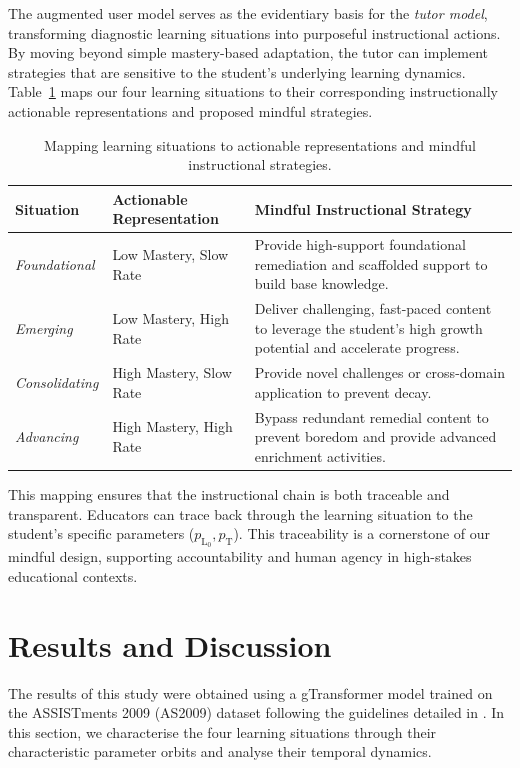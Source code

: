 \documentclass[runningheads]{llncs}
\begin{document}
The augmented user model serves as the evidentiary basis for the \textit{tutor model}, transforming diagnostic learning situations into purposeful instructional actions. By moving beyond simple mastery-based adaptation, the tutor can implement strategies that are sensitive to the student's underlying learning dynamics. Table~\ref{tab_strategies} maps our four learning situations to their corresponding instructionally actionable representations and proposed mindful strategies.

\begin{table}[htb]
\caption{Mapping learning situations to actionable representations and mindful instructional strategies.}
\label{tab_strategies}
\centering
\footnotesize
\begin{tabularx}{\textwidth}{l X X}
\toprule
\textbf{Situation} & \textbf{Actionable Representation} & \textbf{Mindful Instructional Strategy} \\
\midrule
\textit{Foundational} & Low Mastery, Slow Rate & Provide high-support foundational remediation and scaffolded support to build base knowledge. \\
\textit{Emerging} & Low Mastery, High Rate & Deliver challenging, fast-paced content to leverage the student's high growth potential and accelerate progress. \\
\textit{Consolidating} & High Mastery, Slow Rate & Provide novel challenges or cross-domain application to prevent decay. \\
\textit{Advancing} & High Mastery, High Rate & Bypass redundant remedial content to prevent boredom and provide advanced enrichment activities. \\
\bottomrule
\end{tabularx}
\end{table}

This mapping ensures that the instructional chain is both traceable and transparent. Educators can trace back through the learning situation to the student's specific parameters ($p_{\text{L}_0}, p_{\text{T}}$). This traceability is a cornerstone of our mindful design, supporting accountability and human agency in high-stakes educational contexts.

\section{Results and Discussion}

The results of this study were obtained using a gTransformer model trained on the ASSISTments 2009 (AS2009) dataset \cite{feng2009addressing} following the guidelines detailed in \cite{labra2026theory}. In this section, we characterise the four learning situations through their characteristic parameter orbits and analyse their temporal dynamics.
\end{document}

